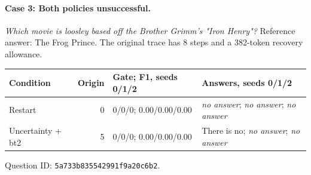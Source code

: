 \par\medskip\noindent\begin{minipage}{\linewidth}
\paragraph{Case 3: Both policies unsuccessful.}
\textit{Which movie is loosley based off the Brother Grimm's "Iron Henry"?} Reference answer: The Frog Prince. The original trace has 8 steps and a 382-token recovery allowance.
\begin{center}\footnotesize
\begin{tabular}{@{}p{.20\linewidth}rp{.16\linewidth}p{.44\linewidth}@{}}
\toprule Condition & Origin & Gate; F1, seeds 0/1/2 & Answers, seeds 0/1/2 \\
\midrule
Restart & 0 & 0/0/0; 0.00/0.00/0.00 & \textit{no answer}; \textit{no answer}; \textit{no answer} \\
Uncertainty + bt2 & 5 & 0/0/0; 0.00/0.00/0.00 & There is no; \textit{no answer}; \textit{no answer} \\
\bottomrule\end{tabular}\end{center}
Question ID: \texttt{5a733b835542991f9a20c6b2}.
\end{minipage}\par

